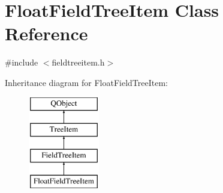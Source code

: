 \hypertarget{class_float_field_tree_item}{\section{Float\-Field\-Tree\-Item Class Reference}
\label{class_float_field_tree_item}
}


{\ttfamily \#include $<$fieldtreeitem.\-h$>$}

Inheritance diagram for Float\-Field\-Tree\-Item\-:\begin{figure}[H]
\begin{center}
\leavevmode
\includegraphics[height=4.000000cm]{class_float_field_tree_item}
\end{center}
\end{figure}
